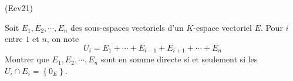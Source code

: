 \begin{tiny}(Eev21)\end{tiny} Soit $E_1, E_2, \cdots, E_n$ des sous-espaces vectoriels d'un $K$-espace vectoriel $E$. Pour $i$ entre $1$ et $n$, on note
\begin{displaymath}
  U_i = E_1+\cdots+E_{i-1}+E_{i+1}+\cdots +E_n
\end{displaymath}
Montrer que $E_1, E_2, \cdots, E_n$ sont en somme directe si et seulement si les $U_i\cap E_i = \left\lbrace 0_E \right\rbrace $.
